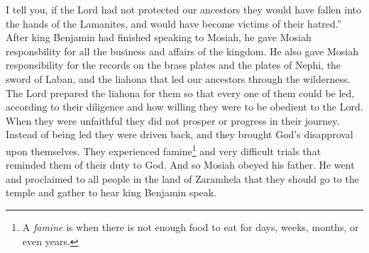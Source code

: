\bverse \iffalse For I say unto you, that if he had not extended his arm in the preservation of our fathers they must have fallen into the hands of the Lamanites, and become victims to their hatred. \fi
I tell you, if the Lord had not protected our ancestors they would have fallen into the hands of the Lamanites, and would have become victims of their hatred.''
\bverse \iffalse And it came to pass that after king Benjamin had made an end of these sayings to his son, that he gave him charge concerning all the affairs of the kingdom. \fi
After king Benjamin had finished speaking to Mosiah, he gave Mosiah responsbility for all the business and affairs of the kingdom.
\bverse \iffalse And moreover, he also gave him charge concerning the records which were engraven on the plates of brass; and also the plates of Nephi; and also, the sword of Laban, and the ball or director, which led our fathers through the wilderness, which was prepared by the hand of the Lord that thereby they might be led, every one according to the heed and diligence which they gave unto him. \fi
He also gave Mosiah responsibility for the records on the brass plates and the plates of Nephi, the sword of Laban, and the liahona that led our ancestors through the wilderness. The Lord prepared the liahona for them so that every one of them could be led, according to their diligence and how willing they were to be obedient to the Lord.
\bverse \iffalse Therefore, as they were unfaithful they did not prosper nor progress in their journey, but were driven back, and incurred the displeasure of God upon them; and therefore they were smitten with famine and sore afflictions, to stir them up in remembrance of their duty. \fi
When they were unfaithful they did not prosper or progress in their journey. Instead of being led they were driven back, and they brought God's disapproval upon themselves. They experienced famine\footnote{A \textit{famine} is when there is not enough food to eat for days, weeks, months, or even years.} and very difficult trials that reminded them of their duty to God.
\bverse \iffalse And now, it came to pass that Mosiah went and did as his father had commanded him, and proclaimed unto all the people who were in the land of Zarahemla that thereby they might gather themselves together, to go up to the temple to hear the words which his father should speak unto them. \fi
And so Mosiah obeyed his father. He went and proclaimed to all people in the land of Zaramhela that they should go to the temple and gather to hear king Benjamin speak.


